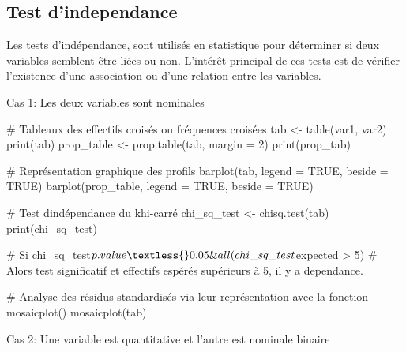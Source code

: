\documentclass[
  letterpaper,
  DIV=11,
  numbers=noendperiod]{scrartcl}
\newenvironment{Shaded}{\begin{snugshade}}{\end{snugshade}}
\newcommand{\AttributeTok}[1]{\textcolor[rgb]{0.40,0.45,0.13}{#1}}
\newcommand{\CommentTok}[1]{\textcolor[rgb]{0.37,0.37,0.37}{#1}}
\newcommand{\ConstantTok}[1]{\textcolor[rgb]{0.56,0.35,0.01}{#1}}
\newcommand{\DecValTok}[1]{\textcolor[rgb]{0.68,0.00,0.00}{#1}}
\newcommand{\FunctionTok}[1]{\textcolor[rgb]{0.28,0.35,0.67}{#1}}
\newcommand{\NormalTok}[1]{\textcolor[rgb]{0.00,0.23,0.31}{#1}}
\newcommand{\OtherTok}[1]{\textcolor[rgb]{0.00,0.23,0.31}{#1}}
\begin{document}
\subsection{Test d'independance}\label{test-dindependance}

Les tests d'indépendance, sont utilisés en statistique pour déterminer
si deux variables semblent être liées ou non. L'intérêt principal de ces
tests est de vérifier l'existence d'une association ou d'une relation
entre les variables.

Cas 1: Les deux variables sont nominales

\begin{Shaded}
\begin{Highlighting}[]
\CommentTok{\# Tableaux des effectifs croisés ou fréquences croisées}
\NormalTok{tab }\OtherTok{\textless{}{-}} \FunctionTok{table}\NormalTok{(var1, var2)}
\FunctionTok{print}\NormalTok{(tab)}
\NormalTok{prop\_table }\OtherTok{\textless{}{-}} \FunctionTok{prop.table}\NormalTok{(tab, }\AttributeTok{margin =} \DecValTok{2}\NormalTok{)}
\FunctionTok{print}\NormalTok{(prop\_tab)}

\CommentTok{\# Représentation graphique des profils}
\FunctionTok{barplot}\NormalTok{(tab, }\AttributeTok{legend =} \ConstantTok{TRUE}\NormalTok{, }\AttributeTok{beside =} \ConstantTok{TRUE}\NormalTok{)}
\FunctionTok{barplot}\NormalTok{(prop\_table, }\AttributeTok{legend =} \ConstantTok{TRUE}\NormalTok{, }\AttributeTok{beside =} \ConstantTok{TRUE}\NormalTok{)}

\CommentTok{\# Test d\textquotesingle{}indépendance du khi{-}carré}
\NormalTok{chi\_sq\_test }\OtherTok{\textless{}{-}} \FunctionTok{chisq.test}\NormalTok{(tab)}
\FunctionTok{print}\NormalTok{(chi\_sq\_test)}

\CommentTok{\# Si chi\_sq\_test$p.value \textless{} 0.05 \& all(chi\_sq\_test$expected \textgreater{} 5)}
\CommentTok{\# Alors test significatif et effectifs espérés supérieurs à 5, il y a dependance. }

\CommentTok{\# Analyse des résidus standardisés via leur représentation avec la fonction mosaicplot()}
\FunctionTok{mosaicplot}\NormalTok{(tab)}
\end{Highlighting}
\end{Shaded}

Cas 2: Une variable est quantitative et l'autre est nominale binaire
\end{document}

